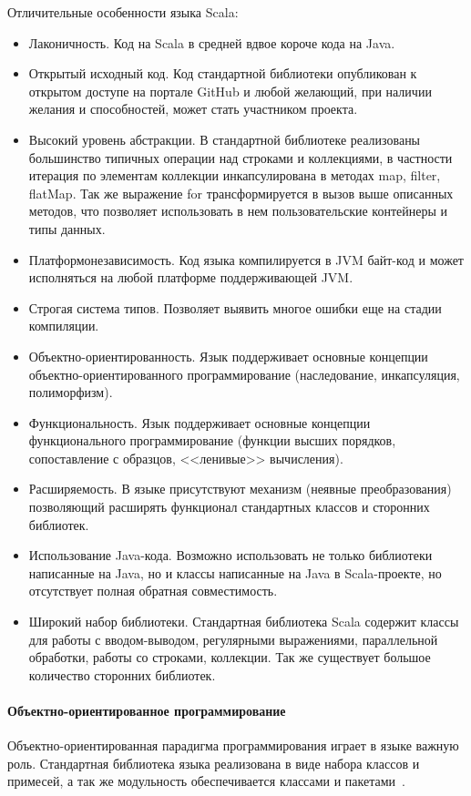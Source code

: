 Отличительные особенности языка Scala:
\begin{itemize}
  \item Лаконичность. Код на Scala в средней вдвое короче кода на Java.
  \item Открытый исходный код. Код стандартной библиотеки опубликован к открытом доступе на портале GitHub и любой желающий, при наличии желания и способностей, может стать участником проекта.
  \item Высокий уровень абстракции. В стандартной библиотеке реализованы большинство типичных операции над строками и коллекциями, в частности итерация по элементам коллекции инкапсулирована в методах map, filter, flatMap. Так же выражение for трансформируется в вызов выше описанных методов, что позволяет использовать в нем пользовательские контейнеры и типы данных.
  \item Платформонезависимость. Код языка компилируется в JVM байт-код и может исполняться на любой платформе поддерживающей JVM.
  \item Строгая система типов. Позволяет выявить многое ошибки еще на стадии компиляции.
  \item Объектно-ориентированность. Язык поддерживает основные концепции объектно-ориентированного программирование (наследование, инкапсуляция, полиморфизм).
  \item Функциональность. Язык поддерживает основные концепции функционального программирование (функции высших порядков, сопоставление с образцов, <<ленивые>> вычисления).
  \item Расширяемость. В языке присутствуют механизм (неявные преобразования) позволяющий расширять функционал стандартных классов и сторонних библиотек.
  \item Использование Java-кода. Возможно использовать не только библиотеки написанные на Java, но и классы написанные на Java в Scala-проекте, но отсутствует полная обратная совместимость.
  \item Широкий набор библиотеки. Стандартная библиотека Scala содержит классы для работы с вводом-выводом, регулярными выражениями, параллельной обработки, работы со строками, коллекции. Так же существует большое количество сторонних библиотек.
\end{itemize}

\paragraph{Объектно-ориентированное программирование}
Объектно-ориентированная парадигма программирования играет в языке важную роль. Стандартная библиотека языка реализована в виде набора классов и примесей, а так же модульность обеспечивается классами и пакетами~\cite{horsman_scala}.

